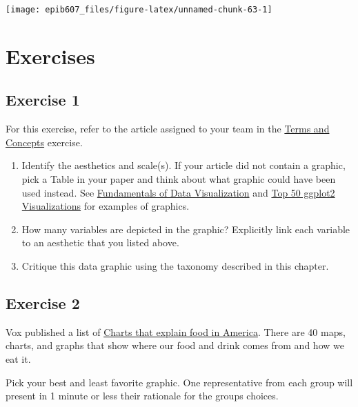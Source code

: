 \documentclass[]{book}
\providecommand{\tightlist}{%
  \setlength{\itemsep}{0pt}\setlength{\parskip}{0pt}}
\providecommand{\tightlist}{%
  \setlength{\itemsep}{0pt}\setlength{\parskip}{0pt}}
\theoremstyle{definition}
\theoremstyle{definition}
\theoremstyle{definition}
\theoremstyle{remark}
\begin{document}
\begin{center}\texttt{[image: epib607\_files/figure-latex/unnamed-chunk-63-1]} \end{center}

\section{Exercises}\label{exercises}

\subsection{Exercise 1}\label{exercise-1}

For this exercise, refer to the article assigned to your team in the
\href{https://sahirbhatnagar.com/EPIB607/terms-and-concepts.html}{Terms
and Concepts} exercise.

\begin{enumerate}
\def\labelenumi{\arabic{enumi}.}
\tightlist
\item
  Identify the aesthetics and scale(s). If your article did not contain
  a graphic, pick a Table in your paper and think about what graphic
  could have been used instead. See
  \href{https://serialmentor.com/dataviz/directory-of-visualizations.html}{Fundamentals
  of Data Visualization} and
  \href{http://r-statistics.co/Top50-Ggplot2-Visualizations-MasterList-R-Code.html\#1.\%20Correlation}{Top
  50 ggplot2 Visualizations} for examples of graphics.
\item
  How many variables are depicted in the graphic? Explicitly link each
  variable to an aesthetic that you listed above.
\item
  Critique this data graphic using the taxonomy described in this
  chapter.
\end{enumerate}

\subsection{Exercise 2}\label{exercise-2}

Vox published a list of
\href{http://www.vox.com/a/explain-food-america}{Charts that explain
food in America}. There are 40 maps, charts, and graphs that show where
our food and drink comes from and how we eat it.

Pick your best and least favorite graphic. One representative from each
group will present in 1 minute or less their rationale for the groups
choices.

\appendix
\end{document}
